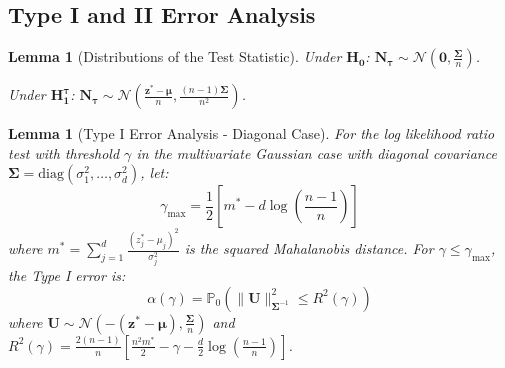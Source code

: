 \documentclass{article}
\theoremstyle{plain}
\newtheorem{lemma}[theorem]{Lemma}
\theoremstyle{definition}
\theoremstyle{remark}
\newcommand{\bs}{\boldsymbol}
\newcommand{\PP}{\ensuremath{\mathbb{P}}}
\newcommand{\cN}{\ensuremath{\mathcal{N}}}
\renewcommand{\leq}{\leqslant}
\begin{document}
\subsection{Type I and II Error Analysis}

\begin{lemma}[Distributions of the Test Statistic]
    Under $\mathbf{H_0}$: $\mathbf{N_\tau} \sim \cN\left(\mathbf{0}, \frac{\bs\Sigma}{n}\right)$.

    Under $\mathbf{H_1^\tau}$: $\mathbf{N_\tau} \sim \cN\left(\frac{\mathbf{z}^* - \bs\mu}{n}, \frac{(n-1)\bs\Sigma}{n^2}\right)$.
\end{lemma}


\begin{lemma}[Type I Error Analysis - Diagonal Case]
    For the log likelihood ratio test with threshold $\gamma$ in the multivariate Gaussian case with diagonal covariance $\bs\Sigma = \mathrm{diag}(\sigma_1^2, \ldots, \sigma_d^2)$, let:
    \begin{equation*}
        \gamma_{\max} = \frac{1}{2}\left[m^* - d\log\left(\frac{n-1}{n}\right)\right]
    \end{equation*}
    where $m^* = \sum_{j=1}^d \frac{(z^*_j - \mu_j)^2}{\sigma_j^2}$ is the squared Mahalanobis distance. For $\gamma \leq \gamma_{\max}$, the Type I error is:
    \begin{equation*}
        \alpha(\gamma) = \PP_0\left(\|\mathbf{U}\|_{\bs\Sigma^{-1}}^2 \leq R^2(\gamma)\right)
    \end{equation*}
    where $\mathbf{U} \sim \mathcal{N}\left(-(\mathbf{z}^* - \bs\mu), \frac{\bs\Sigma}{n}\right)$ and $R^2(\gamma) = \frac{2(n-1)}{n} \left[\frac{n^2 m^*}{2} - \gamma - \frac{d}{2}\log\left(\frac{n-1}{n}\right)\right]$.
\end{lemma}
\end{document}
